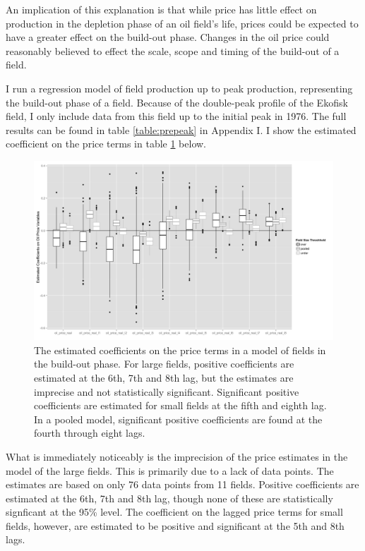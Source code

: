 \documentclass[12pt]{article}
\begin{document}
An implication of this explanation is that while price has little effect on production in the depletion phase of an oil field's life, prices could be expected to have a greater effect on the build-out phase.  Changes in the oil price could reasonably believed to effect the scale, scope and timing of the build-out of a field.  

I run a regression model of field production up to peak production, representing the build-out phase of a field.  Because of the double-peak profile of the Ekofisk field, I only include data from this field up to the initial peak in 1976.  The full results can be found in table \ref{table:prepeak} in Appendix I.  I show the estimated coefficient on the price terms in table \ref{gam_prepeak_print} below.  

\begin{figure}
	\includegraphics[width=1\textwidth]{figures/gam_prepeak_print.png}
	\caption{The estimated coefficients on the price terms in a model of fields in the build-out phase.  For large fields, positive coefficients are estimated at the 6th, 7th and 8th lag, but the estimates are imprecise and not statistically significant.  Significant positive coefficients are estimated for small fields at the fifth and eighth lag.  In a pooled model, significant positive coefficients are found at the fourth through eight lags.}
	\label{gam_prepeak_print}
\end{figure}

What is immediately noticeably is the imprecision of the price estimates in the model of the large fields.  This is primarily due to a lack of data points.  The estimates are based on only 76 data points from 11 fields.  Positive coefficients are estimated at the 6th, 7th and 8th lag, though none of these are statistically signficant at the 95\% level.  The coefficient on the lagged price terms for small fields, however, are estimated to be positive and significant at the 5th and 8th lags.  
\end{document}
